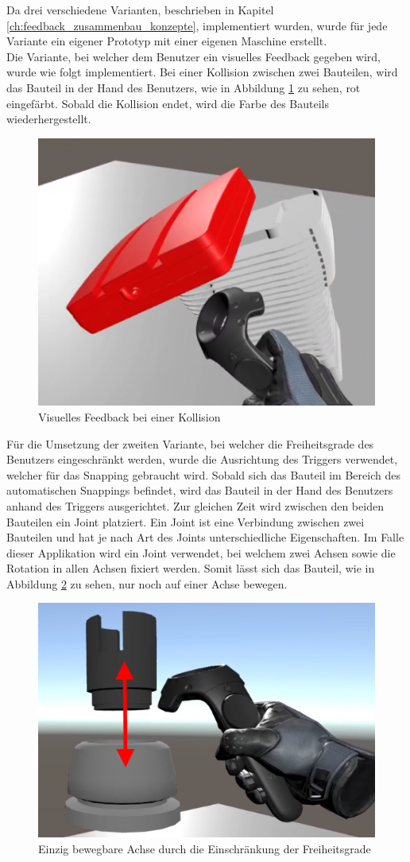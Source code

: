 Da drei verschiedene Varianten, beschrieben in Kapitel \ref{ch:feedback_zusammenbau_konzepte}, implementiert wurden, wurde für jede Variante ein eigener Prototyp mit einer eigenen Maschine erstellt. \\

\noindent Die Variante, bei welcher dem Benutzer ein visuelles Feedback gegeben wird, wurde wie folgt implementiert. Bei einer Kollision zwischen zwei Bauteilen, wird das Bauteil in der Hand des Benutzers, wie in Abbildung \ref{fig:kollision_variante_1} zu sehen, rot eingefärbt. Sobald die Kollision endet, wird die Farbe des Bauteils wiederhergestellt.

\begin{figure}[h!]
	\centering
	\includegraphics[keepaspectratio,width=0.37\linewidth]{img/Kollision_Variante1.PNG}
	\caption{Visuelles Feedback bei einer Kollision}
	\label{fig:kollision_variante_1}
\end{figure}

Für die Umsetzung der zweiten Variante, bei welcher die Freiheitsgrade des Benutzers eingeschränkt werden, wurde die Ausrichtung des Triggers verwendet, welcher für das Snapping gebraucht wird. Sobald sich das Bauteil im Bereich des automatischen Snappings befindet, wird das Bauteil in der Hand des Benutzers anhand des Triggers ausgerichtet. Zur gleichen Zeit wird zwischen den beiden Bauteilen ein Joint platziert. Ein Joint ist eine Verbindung zwischen zwei Bauteilen und hat je nach Art des Joints unterschiedliche Eigenschaften. Im Falle dieser Applikation wird ein Joint verwendet, bei welchem zwei Achsen sowie die Rotation in allen Achsen fixiert werden. Somit lässt sich das Bauteil, wie in Abbildung \ref{fig:einschraenkung_freiheitsgrade} zu sehen, nur noch auf einer Achse bewegen.

\begin{figure}[h!]
	\centering
	\includegraphics[keepaspectratio,width=0.4\linewidth]{img/Einschraenkung_Freiheitsgrade.PNG}
	\caption{Einzig bewegbare Achse durch die Einschränkung der Freiheitsgrade}
	\label{fig:einschraenkung_freiheitsgrade}
\end{figure}

